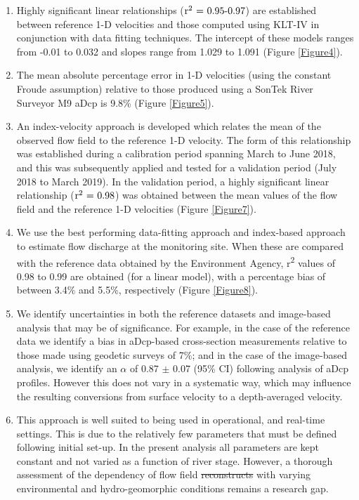 \documentclass[hess, manuscript]{copernicus} %
\providecommand{\DIFadd}[1]{{\protect\color{blue}\uwave{#1}}} %
\providecommand{\DIFdel}[1]{{\protect\color{red}\sout{#1}}} %
\providecommand{\DIFaddbegin}{} %
\providecommand{\DIFaddend}{} %
\providecommand{\DIFdelbegin}{} %
\providecommand{\DIFdelend}{} %
\newcommand{\DIFscaledelfig}{0.5}
\newlength{\DIFdelgraphicswidth} %
\newlength{\DIFdelgraphicsheight} %
\newcommand{\DIFaddincludegraphics}[2][]{{\color{blue}\fbox{\DIFOincludegraphics[#1]{#2}}}} %
\newcommand{\DIFdelincludegraphics}[2][]{%
\sbox{\DIFdelgraphicsbox}{\DIFOincludegraphics[#1]{#2}}%
\settoboxwidth{\DIFdelgraphicswidth}{\DIFdelgraphicsbox} %
\settoboxtotalheight{\DIFdelgraphicsheight}{\DIFdelgraphicsbox} %
\scalebox{\DIFscaledelfig}{%
\parbox[b]{\DIFdelgraphicswidth}{\usebox{\DIFdelgraphicsbox}\\[-\baselineskip] \rule{\DIFdelgraphicswidth}{0em}}\llap{\resizebox{\DIFdelgraphicswidth}{\DIFdelgraphicsheight}{%
\setlength{\unitlength}{\DIFdelgraphicswidth}%
\begin{picture}(1,1)%
\thicklines\linethickness{2pt} %
{\color[rgb]{1,0,0}\put(0,0){\framebox(1,1){}}}%
{\color[rgb]{1,0,0}\put(0,0){\line( 1,1){1}}}%
{\color[rgb]{1,0,0}\put(0,1){\line(1,-1){1}}}%
\end{picture}%
}\hspace*{3pt}}} %
} %
\DeclareRobustCommand{\DIFaddbegin}{\DIFOaddbegin \let\includegraphics\DIFaddincludegraphics} %
\DeclareRobustCommand{\DIFaddend}{\DIFOaddend \let\includegraphics\DIFOincludegraphics} %
\DeclareRobustCommand{\DIFdelbegin}{\DIFOdelbegin \let\includegraphics\DIFdelincludegraphics} %
\DeclareRobustCommand{\DIFdelend}{\DIFOaddend \let\includegraphics\DIFOincludegraphics} %
\begin{document}
\begin{enumerate}
    \item Highly significant linear relationships (${\textnormal{r\textsuperscript{2} = 0.95-0.97}}$) are established between reference 1-D velocities and those computed using KLT-IV in conjunction with data fitting techniques. The intercept of these models ranges from -0.01 to 0.032 and slopes range from 1.029 to 1.091 (Figure \ref{Figure4}). 
    \item The mean absolute percentage error in 1-D velocities (using the constant Froude assumption) relative to those produced using a SonTek River Surveyor M9 aDcp is 9.8\% (Figure \ref{Figure5}).    
    \item An index-velocity approach is developed which relates the mean of the observed flow field to the reference 1-D velocity. The form of this relationship was established during a calibration period spanning March to June 2018, and this was subsequently applied and tested for a validation period (July 2018 to March 2019). In the validation period, a highly significant linear relationship (${\textnormal{r\textsuperscript{2} = 0.98}}$) was obtained between the mean values of the flow field and the reference 1-D velocities (Figure \ref{Figure7}).
    \item We use the best performing data-fitting approach and index-based approach to estimate flow discharge at the monitoring site. When these are compared with the reference data obtained by the Environment Agency, r\textsuperscript{2} values of 0.98 to 0.99 are obtained (for a linear model), with a percentage bias of between 3.4\% and 5.5\%, respectively (Figure \ref{Figure8}).
    \item We identify uncertainties in both the reference datasets and image-based analysis that may be of significance. For example, in the case of the reference data we identify a bias in aDcp-based cross-section measurements relative to those made using geodetic surveys of 7\%; and in the case of the image-based analysis, we identify an $\alpha$ of 0.87 $\pm$ 0.07 (95\% CI) following analysis of aDcp profiles. However this does not vary in a systematic way, which may influence the resulting conversions from surface velocity to a depth-averaged velocity. 
    \item This approach is well suited to being used in operational, and real-time settings. This is due to the relatively few parameters that must be defined following initial set-up. In the present analysis all parameters are kept constant and not varied as a function of river stage. However, a thorough assessment of the dependency of flow field \DIFdelbegin \DIFdel{reconstructs }\DIFdelend \DIFaddbegin \DIFadd{reconstructions }\DIFaddend with varying environmental and hydro-geomorphic conditions remains a research gap. 
\end{enumerate}
\end{document}
